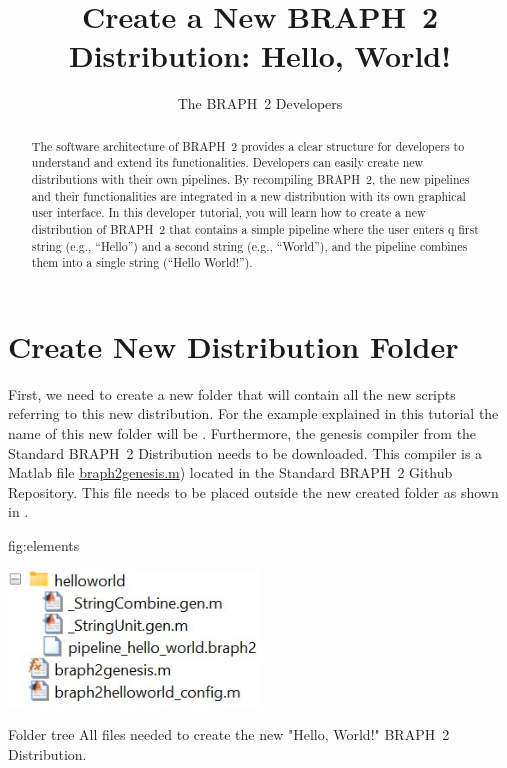 \documentclass{tufte-handout}
\title{Create a New BRAPH~2 Distribution: Hello, World! }
\author[The BRAPH~2 Developers]{The BRAPH~2 Developers}
\begin{document}
\maketitle

\begin{abstract}
\noindent
The software architecture of BRAPH~2 provides a clear structure for developers to understand and extend its functionalities. Developers can easily create new distributions with their own pipelines. 
By recompiling BRAPH~2, the new pipelines and their functionalities are integrated in a new distribution with its own graphical user interface.
In this developer tutorial, you will learn how to create a new distribution of BRAPH~2 that contains a simple pipeline where the user enters q first string (e.g., “Hello”) and a second string (e.g., “World”), and the pipeline combines them into a single string (“Hello World!”).
\end{abstract}

\tableofcontents

\clearpage
\section{Create New Distribution Folder}

First, we need to create a new folder that will contain all the new scripts referring to this new distribution. For the example explained in this tutorial the name of this new folder will be . Furthermore, the genesis compiler from the Standard BRAPH~2 Distribution needs to be downloaded. This compiler is a Matlab file \href{https://github.com/braph-software/BRAPH-2/tree/develop/braph2genesis/braph2genesis.m}{braph2genesis.m})  located in the Standard BRAPH~2 Github Repository. This file needs to be placed outside the new created folder  as shown in .

{fig:elements}
{\centerline{\includegraphics[width=0.5\textwidth]{fig01.jpg}}}
{Folder tree}
{
	All files needed to create the new "Hello, World!" BRAPH~2 Distribution.
}

\end{document}
